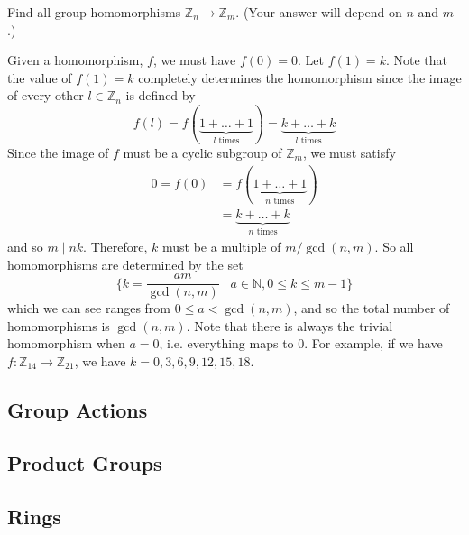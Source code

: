   \begin{exercise}[Assigned]
    Find all group homomorphisms $\mathbb{Z}_n \to \mathbb{Z}_m$. (Your answer will depend on $n$ and $m$.) 
  \end{exercise}
  \begin{solution}
    Given a homomorphism, $f$, we must have $f(0) = 0$. Let $f(1) = k$. Note that the value of $f(1) = k$ completely determines the homomorphism since the image of every other $l \in \mathbb{Z}_n$ is defined by 
    \begin{equation}
      f(l) = f(\underbrace{1 + \ldots + 1}_{l \text{ times}}) = \underbrace{k + \ldots + k}_{l \text{ times}}
    \end{equation}
    Since the image of $f$ must be a cyclic subgroup of $\mathbb{Z}_m$, we must satisfy 
    \begin{align}
      0 = f(0) & = f(\underbrace{1 + \ldots + 1}_{n \text{ times}}) \\
               & = \underbrace{k + \ldots + k}_{n \text{ times}} 
    \end{align}
    and so $m \mid nk$. Therefore, $k$ must be a multiple of $m/\gcd(n, m)$. So all homomorphisms are determined by the set 
    \begin{equation}
      \bigg\{ k = \frac{a m}{\gcd(n, m)} \; \bigg| \; a \in \mathbb{N}, 0 \leq k \leq m-1 \bigg\}
    \end{equation}
    which we can see ranges from $0 \leq a < \gcd(n, m)$, and so the total number of homomorphisms is $\gcd(n, m)$. Note that there is always the trivial homomorphism when $a = 0$, i.e. everything maps to $0$. For example, if we have $f: \mathbb{Z}_{14} \to \mathbb{Z}_{21}$, we have $k = 0, 3, 6, 9, 12, 15, 18$. 
  \end{solution}

\subsection{Group Actions}

\subsection{Product Groups}

\subsection{Rings}

